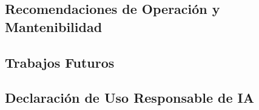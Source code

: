 \subsection{Recomendaciones de Operación y Mantenibilidad}



\subsection{Trabajos Futuros}


\subsection{Declaración de Uso Responsable de IA}

